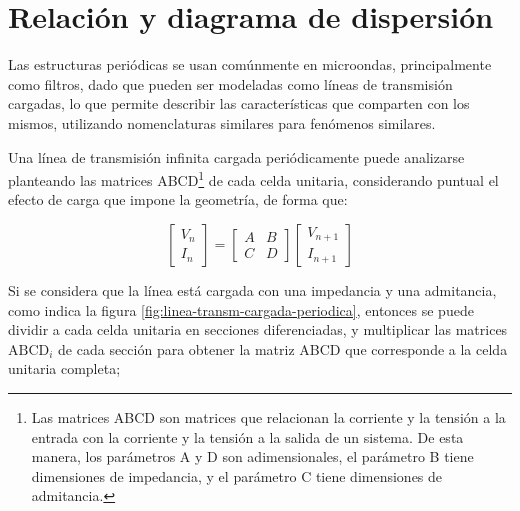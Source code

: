 \section{Relación y diagrama de dispersión}
\label{sec_bloch}

Las estructuras periódicas se usan comúnmente en microondas, principalmente como filtros, dado que pueden ser modeladas como líneas de transmisión cargadas, lo que permite describir las características que comparten con los mismos, utilizando nomenclaturas similares para fenómenos similares.

Una línea de transmisión infinita cargada periódicamente puede analizarse planteando las matrices ABCD\footnote{Las matrices ABCD son matrices que relacionan la corriente y la tensión a la entrada con la corriente y la tensión a la salida de un sistema. De esta manera, los parámetros A y D son adimensionales, el parámetro B tiene dimensiones de impedancia, y el parámetro C tiene dimensiones de admitancia.} de cada celda unitaria, considerando puntual el efecto de carga que impone la geometría, de forma que:

\begin{equation}
	\begin{bmatrix}
		V_n \\
		I_n
	\end{bmatrix}
	=
	\begin{bmatrix}
		A & B \\
		C & D
	\end{bmatrix}
	\begin{bmatrix}
		V_{n+1} \\
		I_{n+1}
	\end{bmatrix}
\end{equation}

Si se considera que la línea está cargada con una impedancia y una admitancia, como indica la figura \ref{fig:linea-transm-cargada-periodica}, entonces se puede dividir a cada celda unitaria en secciones diferenciadas, y multiplicar las matrices $\text{ABCD}_{i}$ de cada sección para obtener la matriz ABCD que corresponde a la celda unitaria completa;

